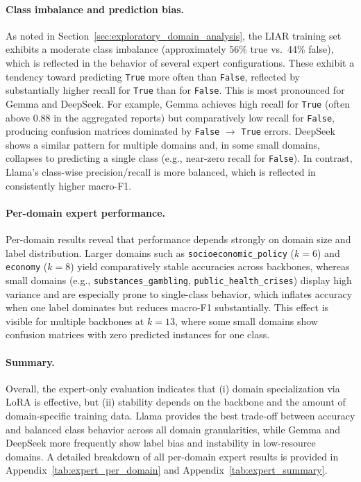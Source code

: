 \paragraph{Class imbalance and prediction bias.}
As noted in Section~\ref{sec:exploratory_domain_analysis}, the LIAR training set 
exhibits a moderate class imbalance (approximately 56\% true vs.\ 44\% false), 
which is reflected in the behavior of several expert configurations. These exhibit 
a tendency toward predicting \texttt{True} more often than \texttt{False}, reflected 
by substantially higher recall for \texttt{True} than for \texttt{False}. This is 
most pronounced for Gemma and DeepSeek. For example, Gemma achieves high recall for 
\texttt{True} (often above 0.88 in the aggregated reports) but comparatively low 
recall for \texttt{False}, producing confusion matrices dominated by \texttt{False} 
$\rightarrow$ \texttt{True} errors. DeepSeek shows a similar pattern for multiple 
domains and, in some small domains, collapses to predicting a single class (e.g., 
near-zero recall for \texttt{False}). In contrast, Llama's class-wise 
precision/recall is more balanced, which is reflected in consistently higher macro-F1.

\paragraph{Per-domain expert performance.}
Per-domain results reveal that performance depends strongly on domain size and label
distribution. Larger domains such as \texttt{socioeconomic\_policy} ($k{=}6$) and
\texttt{economy} ($k{=}8$) yield comparatively stable accuracies across backbones,
whereas small domains (e.g., \texttt{substances\_gambling}, \texttt{public\allowbreak\_health\_crises})
display high variance and are especially prone to single-class behavior, which inflates
accuracy when one label dominates but reduces macro-F1 substantially. This effect is visible
for multiple backbones at $k{=}13$, where some small domains show confusion matrices with
zero predicted instances for one class.

\paragraph{Summary.}
Overall, the expert-only evaluation indicates that (i) domain specialization via LoRA is
effective, but (ii) stability depends on the backbone and the amount of domain-specific
training data. Llama provides the best trade-off between accuracy and balanced class
behavior across all domain granularities, while Gemma and DeepSeek more frequently show
label bias and instability in low-resource domains. A detailed breakdown of all per-domain expert results is provided in Appendix~\ref{tab:expert_per_domain} and Appendix~\ref{tab:expert_summary}.

